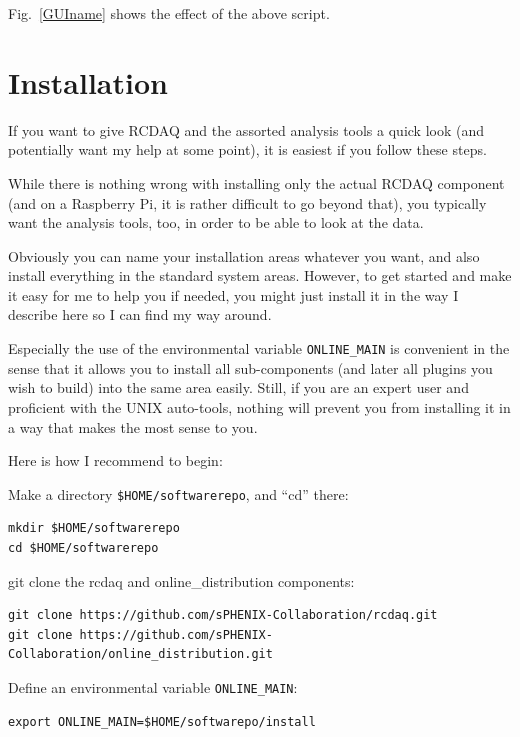 \documentclass{article}[11pt]
\begin{document}
Fig.~\ref{GUIname} shows the effect of the above script.

\section{Installation}
\label{installation}

If you want to give RCDAQ and the assorted analysis tools a quick look
(and potentially want my help at some point), it is easiest if you
follow these steps.

While there is nothing wrong with installing only the actual RCDAQ
component (and on a Raspberry Pi, it is rather difficult to go beyond
that), you typically want the analysis tools, too, in order to be able
to look at the data.

Obviously you can name your installation areas whatever you want, and
also install everything in the standard system areas. However, to get
started and make it easy for me to help you if needed, you might just
install it in the way I describe here so I can find my way around.

Especially the use of the environmental variable \verb|ONLINE_MAIN| is
convenient in the sense that it allows you to install all
sub-components (and later all plugins you wish to build) into the same
area easily. Still, if you are an expert user and proficient with the
UNIX auto-tools, nothing will prevent you from installing it in a way
that makes the most sense to you.

Here is how I recommend to begin:

Make a directory {\tt \$HOME/softwarerepo}, and ``cd'' there:

\begin{verbatim}
mkdir $HOME/softwarerepo
cd $HOME/softwarerepo
\end{verbatim}

git clone the rcdaq and online\_distribution components:

\begin{verbatim}
git clone https://github.com/sPHENIX-Collaboration/rcdaq.git
git clone https://github.com/sPHENIX-Collaboration/online_distribution.git
\end{verbatim}

Define an environmental variable \verb|ONLINE_MAIN|:

\begin{verbatim}
export ONLINE_MAIN=$HOME/softwarepo/install
\end{verbatim}
\end{document}
